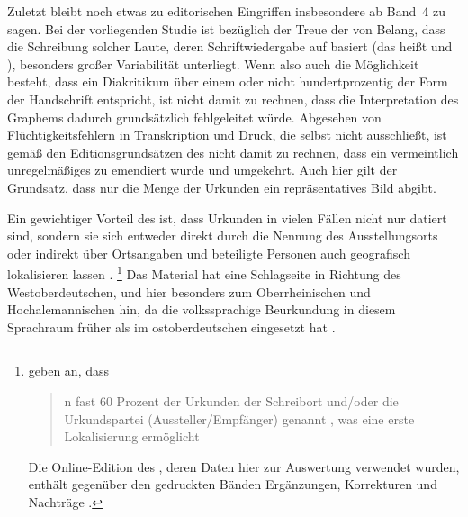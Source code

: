 Zuletzt bleibt noch etwas zu editorischen Eingriffen
insbesondere ab Band~4\nocite{cao4} zu sagen. Bei der vorliegenden Studie ist
bezüglich der Treue der  von Belang, dass die Schreibung
solcher Laute, deren Schriftwiedergabe auf  basiert (das heißt  und ), besonders großer Variabilität unterliegt.
Wenn also auch die Möglichkeit besteht, dass ein Diakritikum über einem 
oder  nicht hundertprozentig der Form der Handschrift entspricht, ist
nicht damit zu rechnen, dass die Interpretation des Graphems dadurch
grundsätzlich fehlgeleitet würde. Abgesehen von %
Flüchtigkeitsfehlern in Transkription und Druck, die selbst \citet[\RN{60},
\RN{78}]{wilhelm1932} nicht ausschließt, ist gemäß den
Editionsgrundsätzen des \CAO{} nicht damit zu rechnen,
dass ein vermeintlich unregelmäßiges  zu  emendiert wurde und
umgekehrt. Auch hier gilt der Grundsatz, dass nur die Menge der Urkunden ein
repräsentatives Bild abgibt.

Ein gewichtiger Vorteil des \CAO{} ist, dass Urkunden in vielen
Fällen nicht nur datiert sind, sondern sie sich entweder direkt durch die
Nennung des Ausstellungsorts oder indirekt über Ortsangaben und beteiligte
Personen auch geografisch lokalisieren lassen
\autocite[16]{schulze2011}.%
%
	\footnote{\citet[393]{gniffkerapp2005} geben an, dass
	\blockquote{n fast 60 Prozent der Urkunden
	\textelp{} der Schreibort und/oder die Urkundspartei (Aussteller/Empfänger)
	genannt , was eine erste Lokalisierung ermöglicht}. Die
	Online-Edition des \CAO{} \autocite{cao-online}, deren Daten hier zur
	Auswertung verwendet wurden, enthält gegenüber den gedruckten Bänden
	Ergänzungen, Korrekturen und Nachträge
	\autocite[vgl.][393--394]{gniffkerapp2005}.}
%
Das Material hat eine Schlagseite in Richtung des
Westoberdeutschen, und hier besonders zum
Oberrheinischen und Hochalemannischen hin, da
die volkssprachige Beurkundung in diesem
Sprachraum früher als im ostoberdeutschen
eingesetzt hat \autocites[1774]{skala1985}[15]{schulze2011}.

